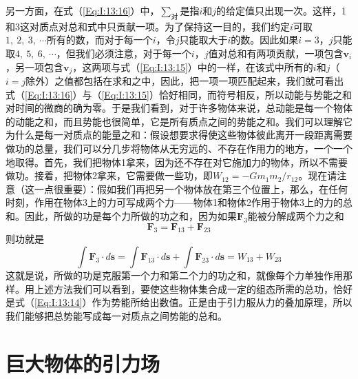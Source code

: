 另一方面，在式（\ref{Eq:I:13:16}）中，$\sum_{\text{对}}$是指$i$和$j$的给定值只出现一次。这样，1和3这对质点对总和式中只贡献一项。为了保持这一目的，我们约定$i$可取$1,~2,~3,~\cdots$所有的数，而对于每一个$i$，令$j$只能取大于$i$的数。因此如果$i=3$，$j$只能取$4,~5,~6,~\cdots$，但我们必须注意，对于每一个$i$，$j$值对总和有两项贡献，一项包含$\boldsymbol{v}_i$，另一项包含$\boldsymbol{v}_j$，这两项与式（\ref{Eq:I:13:15}）中的一样，在该式中所有的$i$和$j$（$i=j$除外）之值都包括在求和之中，因此，把一项一项匹配起来，我们就可看出式（\ref{Eq:I:13:16}）与（\ref{Eq:I:13:15}）恰好相同，而符号相反，所以动能与势能之和对时间的微商的确为零。于是我们看到，对于许多物体来说，总动能是每一个物体的动能之和，而且势能也很简单，它是所有质点之间的势能之和。我们可以理解它为什么是每一对质点的能量之和：假设想要求得使这些物体彼此离开一段距离需要做功的总量，我们可以分几步将物体从无穷远的、不存在作用力的地方，一个一个地取得。首先，我们把物体1拿来，因为还不存在对它施加力的物体，所以不需要做功。接着，把物体2拿来，它需要做一些功，即$W_{12}=-Gm_1m_2/r_{12}$。现在请注意（这一点很重要）：假如我们再把另一个物体放在第三个位置上，那么，在任何时刻，作用在物体3上的力可写成两个力——物体1和物体2作用于物体3上的力的总和。因此，所做的功是每个力所做的功之和，因为如果$\boldsymbol{F}_3$能被分解成两个力之和
\begin{equation*}
    \boldsymbol{F}_3 = \boldsymbol{F}_{13}+\boldsymbol{F}_{23}
\end{equation*}
则功就是
\begin{equation*}
    \int \boldsymbol{F}_3 \cdot d\boldsymbol{s} = \int \boldsymbol{F}_{13} \cdot d\boldsymbol{s} + \int \boldsymbol{F}_{23} \cdot d\boldsymbol{s} = W_{13} + W_{23}
\end{equation*}
这就是说，所做的功是克服第一个力和第二个力的功之和，就像每个力单独作用那样。用上述方法我们可以看到，要使这些物体集合成一定的组态所需的总功，恰好是式（\ref{Eq:I:13:14}）作为势能所给出数值。正是由于引力服从力的叠加原理，所以我们能够把总势能写成每一对质点之间势能的总和。

\section{巨大物体的引力场}

